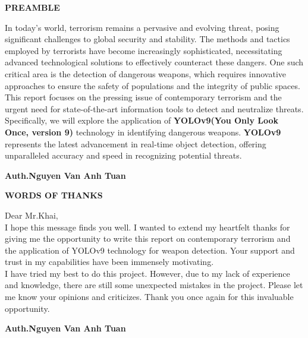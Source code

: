 \documentclass[a4paper,13pt]{report}
\begin{document}
    \newpage
    \thispagestyle{plain}
    \centering
    \justifying
    \centerline{\textbf{\huge{PREAMBLE}}}
    \vspace{10mm}
    \begin{flushleft}
        In today's world, terrorism remains a pervasive and evolving threat, posing significant challenges to global security and stability. The methods and tactics employed by terrorists have become increasingly sophisticated, necessitating advanced technological solutions to effectively counteract these dangers. One such critical area is the detection of dangerous weapons, which requires innovative approaches to ensure the safety of populations and the integrity of public spaces. \\ 
        \vspace{2mm}
        This report focuses on the pressing issue of contemporary terrorism and the urgent need for state-of-the-art information tools to detect and neutralize threats. Specifically, we will explore the application of \textbf{YOLOv9(You Only Look Once, version 9)}  technology in identifying dangerous weapons. \textbf{YOLOv9} represents the latest advancement in real-time object detection, offering unparalleled accuracy and speed in recognizing potential threats.
    \end{flushleft}
    \begin{flushright}
        \textbf{Auth.Nguyen Van Anh Tuan}
    \end{flushright}

    \newpage
    \thispagestyle{plain}
    \centering
    \justifying
    \centerline{\textbf{\huge{WORDS OF THANKS}}}
    \vspace{10mm}
    \begin{flushleft}
        Dear Mr.Khai, \\
        \vspace{2mm}
        I hope this message finds you well. I wanted to extend my heartfelt thanks for giving me the opportunity to write this report on contemporary terrorism and the application of YOLOv9 technology for weapon detection. Your support and trust in my capabilities have been immensely motivating. \\ 
        \vspace{2mm}
        I have tried my best to do this project. However, due to my lack of experience and 
        knowledge, there are still some unexpected mistakes in the project. Please let me know your opinions and criticizes.
        Thank you once again for this invaluable opportunity.
    \end{flushleft}
    \begin{flushright}
        \textbf{Auth.Nguyen Van Anh Tuan}
    \end{flushright}
\end{document}
